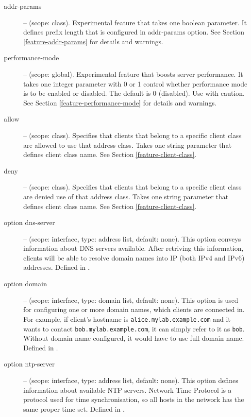 \begin{description}
\item[addr-params] -- (scope: class). Experimental feature that takes
  one boolean parameter. It defines prefix length that is configured
  in addr-params option. See Section \ref{feature-addr-params} for
  details and warnings.

\item[performance-mode] -- (scope: global). Experimental
    feature that boosts server performance. It takes one integer
    parameter with 0 or 1 control whether performance mode is to be
    enabled or disabled. The default is 0 (disabled). Use with
    caution. See Section \ref{feature-performance-mode} for details
    and warnings.

\item[allow] -- (scope: class). Specifies that clients that belong to
  a specific client class are allowed to use that address class. Takes
  one string parameter that defines client class name. See Section
  \ref{feature-client-class}.

\item[deny] -- (scope: class). Specifies that clients that belong to
  a specific client class are denied use of that address class. Takes
  one string parameter that defines client class name. See Section
  \ref{feature-client-class}.

 \item[option dns-server] -- (scope: interface, type: address list, default:
   none). This option conveys information about DNS servers
   available. After retriving this information, clients will be able
   to resolve domain names into IP (both IPv4 and IPv6)
   addresses. Defined in \cite{rfc3596}.

 \item[option domain] -- (scope: interface, type: domain list, default:
   none). This option is used for configuring one or more domain
   names, which clients are connected in. For example, if client's
   hostname is \verb+alice.mylab.example.com+ and it wants to contact
   \verb+bob.mylab.example.com+, it can simply refer to it as
   \verb+bob+. Without domain name configured, it would have to use
   full domain name. Defined in \cite{rfc3596}.

 \item[option ntp-server] -- (scope: interface, type: address list, default:
   none). This option defines information about available NTP
   servers. Network Time Protocol \cite{rfc2030} is a protocol used
   for time synchronisation, so all hosts in the network has the same
   proper time set. Defined in \cite{rfc4075}.


\end{description}
